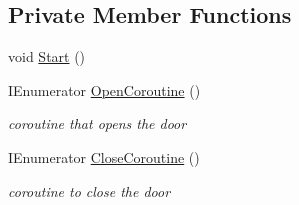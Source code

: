 \subsection*{Private Member Functions}
\begin{DoxyCompactItemize}
\item 
void \mbox{\hyperlink{class_single_hinge_door_a66856e16ddf504f379a4ee5601f295c6}{Start}} ()
\item 
I\+Enumerator \mbox{\hyperlink{class_single_hinge_door_ae0aa0776b9f80616a0b2a35d968101ad}{Open\+Coroutine}} ()
\begin{DoxyCompactList}\small\item\em coroutine that opens the door \end{DoxyCompactList}\item 
I\+Enumerator \mbox{\hyperlink{class_single_hinge_door_a6b1760cbc6ac5ed4c0e9d7ecb10d2606}{Close\+Coroutine}} ()
\begin{DoxyCompactList}\small\item\em coroutine to close the door \end{DoxyCompactList}\end{DoxyCompactItemize}
